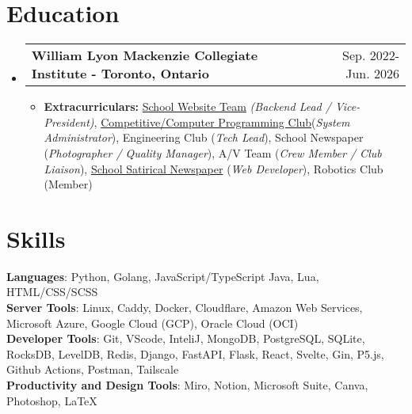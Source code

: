 \documentclass[letterpaper,11pt]{article}
\makeatletter
\newcommand{\resumeItem}[1]{
    \item\small{
            {#1 \vspace{-2pt}}
    }
}
\newcommand{\shortResumeSubheading}[2]{%
    \vspace{-2pt}\item
    \begin{tabular*}{0.97\textwidth}[t]{@{}l@{\extracolsep{\fill}}r@{}}
        \textbf{#1} & #2 \\
    \end{tabular*}\vspace{-7pt}%
}
\newcommand{\resumeSubHeadingListStart}{\begin{itemize}[leftmargin=0.15in, label={}]}
\newcommand{\resumeSubHeadingListEnd}{\end{itemize}}
\newcommand{\resumeItemListStart}{\begin{itemize}}
\newcommand{\resumeItemListEnd}{\end{itemize}\vspace{-5pt}}
\makeatother
\begin{document}
\section{Education}
\resumeSubHeadingListStart
\shortResumeSubheading
{William Lyon Mackenzie Collegiate Institute - Toronto, Ontario}{Sep. 2022- Jun. 2026}
\resumeItemListStart
\resumeItem{\textbf{Extracurriculars: }\href{https://maclyonsden.com}{School Website Team}  \emph{(Backend Lead / Vice-President)}, \href{https://mcpt.ca}{Competitive/Computer Programming Club}{(\emph{System Administrator})}, Engineering Club (\emph{Tech Lead}), School Newspaper (\emph{Photographer / Quality Manager}), A/V Team (\emph{Crew Member / Club Liaison}), \href{https://flounder.news}{School Satirical Newspaper} (\emph{Web Developer}), Robotics Club (Member)}
\resumeItemListEnd
\resumeSubHeadingListEnd


\section{Skills}
\small{

\textbf{Languages}{: Python, Golang, JavaScript/TypeScript Java, Lua, HTML/CSS/SCSS} \\
\textbf{Server Tools}{: Linux, Caddy, Docker, Cloudflare, Amazon Web Services, Microsoft Azure, Google Cloud (GCP), Oracle Cloud (OCI)} \\
\textbf{Developer Tools}{: Git, VScode, InteliJ, MongoDB, PostgreSQL, SQLite, RocksDB, LevelDB, Redis, Django, FastAPI, Flask, React, Svelte, Gin, P5.js, Github Actions, Postman, Tailscale} \\
\textbf{Productivity and Design Tools}{: Miro, Notion, Microsoft Suite, Canva, Photoshop, \LaTeX} \\
}
\end{document}
